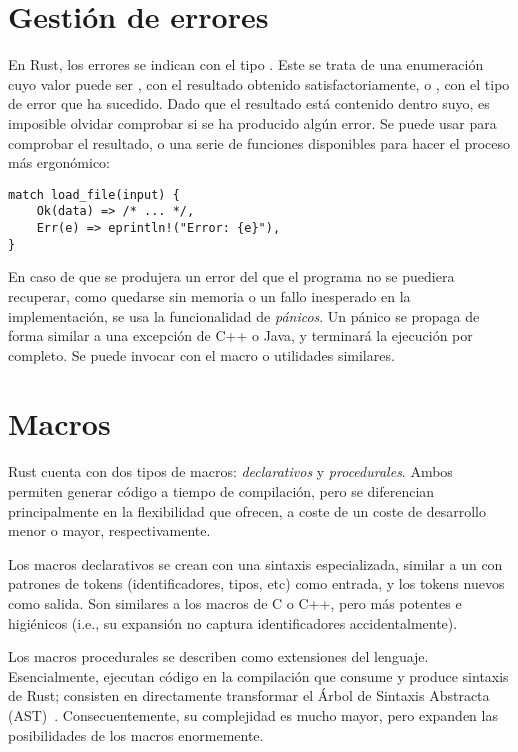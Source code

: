 \section{Gestión de errores}

En Rust, los errores se indican con el tipo . Este se trata
de una enumeración cuyo valor puede ser , con el resultado obtenido
satisfactoriamente, o , con el tipo de error que ha sucedido. Dado
que el resultado está contenido dentro suyo, es imposible olvidar comprobar si
se ha producido algún error. Se puede usar  para comprobar el
resultado, o una serie de funciones disponibles para hacer el proceso más
ergonómico:

\begin{verbatim}
match load_file(input) {
    Ok(data) => /* ... */,
    Err(e) => eprintln!("Error: {e}"),
}
\end{verbatim}

En caso de que se produjera un error del que el programa no se puediera
recuperar, como quedarse sin memoria o un fallo inesperado en la implementación,
se usa la funcionalidad de \emph{pánicos}. Un pánico se propaga de forma similar
a una excepción de C++ o Java, y terminará la ejecución por completo. Se puede
invocar con el macro  o utilidades similares.

\section{Macros}

Rust cuenta con dos tipos de macros: \emph{declarativos} y \emph{procedurales}.
Ambos permiten generar código a tiempo de compilación, pero se diferencian
principalmente en la flexibilidad que ofrecen, a coste de un coste de desarrollo
menor o mayor, respectivamente.

Los macros declarativos se crean con una sintaxis especializada, similar a un
 con patrones de tokens (identificadores, tipos, etc) como entrada,
y los tokens nuevos como salida. Son similares a los macros de C o C++, pero más
potentes e higiénicos (i.e., su expansión no captura identificadores
accidentalmente).

Los macros procedurales se describen como extensiones del lenguaje.
Esencialmente, ejecutan código en la compilación que consume y produce sintaxis
de Rust; consisten en directamente transformar el Árbol de Sintaxis Abstracta
(AST)~\cite[Procedural Macros]{rustref}. Consecuentemente, su complejidad es
mucho mayor, pero expanden las posibilidades de los macros enormemente.

